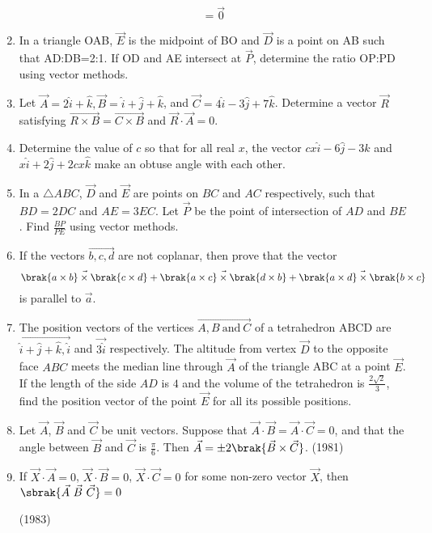 \begin{enumerate}[label=\thesubsection.\arabic*.,ref=\thesubsection.\theenumi]
$${ }=\vec{0}
		$$ \hfill{}
	\item In a triangle OAB, $\vec{E}$ is the midpoint of BO and $\vec{D}$ is a point on AB such that AD:DB=2:1. If OD and AE intersect at $\vec{P}$, determine the ratio OP:PD  using vector methods. \hfill{}
	\item Let $\vec{A}=2\hat{i}+\hat{k},\vec{B}=\hat{i}+\hat{j}+\hat{k}$, and $\vec{C}=4\hat{i}-3\hat{j}+7\hat{k}$. Determine a vector $\vec{R}$ satisfying $\vec{R\times B}=\vec{C\times B}$ and $\vec{R}\cdot\vec{A}=0$. \hfill{}
	\item Determine the value of $c$ so that for all real $x$, the vector $cx\hat{i}-6\hat{j}-3\hat{k}$ and $x\hat{i}+2\hat{j}+2cx\hat{k}$ make an obtuse angle with each other. \hfill{}
	\item In a $\triangle ABC$, $\vec{D}$ and $\vec{E}$ are points on $BC$ and $AC$ respectively, such that $BD=2DC$ and $AE=3EC$. Let $\vec{P}$ be the point of intersection of $AD$ and $BE$. Find $\frac{BP}{PE}$ using vector methods. \hfill{}
	\item If the vectors $\vec{b,c,d}$ are not coplanar, then prove that the vector $$\vec{\brak{a\times b}\times\brak{c\times d}}+\vec{\brak{a\times c}\times\brak{d\times b}}+\vec{\brak{a\times d}\times\brak{b\times c}}$$ is parallel to $\vec{a}$. \hfill{}
	\item The position vectors of the vertices $\vec{A,B\ \text{and}\ C}$ of a tetrahedron ABCD are $\vec{\hat{i}+\hat{j}+\hat{k},\hat{i}}$ and $\vec{3\hat{i}}$ respectively. The altitude from vertex $\vec{D}$ to the opposite face $ABC$ meets the median line through $\vec{A}$ of the triangle ABC at a point $\vec{E}$. If the length of the side $AD$ is $4$ and the volume of the tetrahedron is $\frac{2\sqrt{2}}{3}$, find the position vector of the point $\vec{E}$ for all its possible positions. \hfill{}
\item Let $\vec{A}$, $\vec{B}$ and $\vec{C}$ be unit vectors. Suppose that $\vec{A}\cdot\vec{B} = \vec{A}\cdot\vec{C}=0$, and that the angle between $\vec{B}$ and $\vec{C}$ is $\frac{\pi}{6}$. Then $\vec{A}=\pm2\brak{\vec{B}\times\vec{C}}$.
\hfill (1981)
\item If $\vec{X}\cdot\vec{A}=0$, $\vec{X}\cdot\vec{B}=0$, $\vec{X}\cdot\vec{C}=0$ for some non-zero vector $\vec{X}$, then $\sbrak{\vec{A}\ \vec{B}\ \vec{C}}=0$

\hfill (1983)


\end{enumerate}
